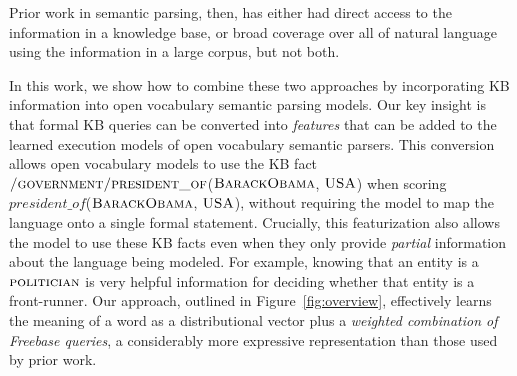 \documentclass[11pt,letterpaper]{article}
\newcommand{\figref}[1]{Figure~\ref{fig:#1}}
\newcommand{\lexicalpredicate}[1]{\ensuremath{\textit{#1}}}
\newcommand{\formalpredicate}[1]{{\small \ensuremath{\textsc{#1}}}}
\begin{document}
\begin{figure*}[ht]

  \caption{Overview of the components of our model.  Given an input text, we use a CCG parser and
  an entity linker to produce a logical form with predicates derived from the text (shown in
  italics).  For each predicate, we learn a distributional vector $\theta$, as well as weights
  $\omega$ associated with a set of selected Freebase queries.  For each entity and entity pair, we
  learn a distributional vector $\phi$, and we extract a binary feature vector $\psi$ from
  Freebase, indicating whether each entity or entity pair is in the set returned by the selected
  Freebase queries.  These models are combined to assign probabilities to candidate entities.}
  \label{fig:overview}
\end{figure*}

Prior work in semantic parsing, then, has either had direct access to the information in a
knowledge base, or broad coverage over all of natural language using the information in a large
corpus, but not both.

In this work, we show how to combine these two approaches by incorporating KB information into open
vocabulary semantic parsing models.  Our key insight is that formal KB queries can be converted
into \emph{features} that can be added to the learned execution models of open vocabulary semantic
parsers.  This conversion allows open vocabulary models to use the KB fact
\formalpredicate{/government/president\_of}(\formalpredicate{BarackObama}, \formalpredicate{USA})
when scoring \lexicalpredicate{president\_of}(\formalpredicate{BarackObama},
\formalpredicate{USA}), without requiring the model to map the language onto a single formal
statement.  Crucially, this featurization also allows the model to use these KB facts even when
they only provide \emph{partial} information about the language being modeled.  For example,
knowing that an entity is a \formalpredicate{politician} is very helpful information for deciding
whether that entity is a front-runner.  Our approach, outlined in \figref{overview}, effectively
learns the meaning of a word as a distributional vector plus a \emph{weighted combination of
Freebase queries}, a considerably more expressive representation than those used by prior work.
\end{document}

